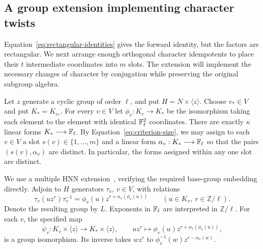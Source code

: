 \subsection{A group extension implementing character twists}

Equation~\eqref{eq:rectangular-identities} gives the forward identity,
but the factors are rectangular. We next arrange enough orthogonal
character idempotents to place their $t$ intermediate coordinates into
$m$ slots. The extension will implement the necessary changes of character
by conjugation while preserving the original subgroup algebra.

Let $z$ generate a cyclic group of order $\ell$, and put
$H=N\times\langle z\rangle$. Choose $v_*\in V$ and put $K_*=K_{v_*}$.
For every $v\in V$ let $\phi_v:K_v\longrightarrow K_*$ be the
isomorphism taking each element to the element with identical
$\mathbb F_\ell^2$ coordinates. There are exactly $\kappa$ linear forms
$K_*\longrightarrow\mathbb F_\ell$. By Equation~\eqref{eq:criterion-size},
we may assign to each $v\in V$ a slot $s(v)\in\{1,\ldots,m\}$ and a
linear form $\alpha_v:K_*\longrightarrow\mathbb F_\ell$ so that the pairs
$(s(v),\alpha_v)$ are distinct. In particular, the forms assigned within
any one slot are distinct.

We use a multiple HNN extension~\cite[Theorem~II]{HNN1949}, verifying
the required base-group embedding directly. Adjoin to $H$ generators
$\tau_v$, $v\in V$, with relations
\begin{equation}
\label{eq:twisted-conjugation}
\tau_v(uz^r)\tau_v^{-1}
 =\phi_v(u)z^{r+\alpha_v(\phi_v(u))}
\qquad(u\in K_v,\ r\in\mathbb Z/\ell).
\end{equation}
Denote the resulting group by $L$. Exponents in $\mathbb F_\ell$ are
interpreted in $\mathbb Z/\ell$. For each $v$, the specified map
\[
\psi_v:K_v\times\langle z\rangle\longrightarrow
K_*\times\langle z\rangle,
\qquad
uz^r\longmapsto\phi_v(u)z^{r+\alpha_v(\phi_v(u))},
\]
is a group isomorphism. Its inverse takes $wz^r$ to
$\phi_v^{-1}(w)z^{r-\alpha_v(w)}$.

